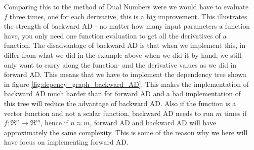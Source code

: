 Comparing this to the method of Dual Numbers were we would have to evaluate $f$ three times, one for each derivative, this is a big improvement. This illustrates the strength of backward AD - no matter how many input parameters a function have, you only need one function evaluation to get all the derivatives of a function. The disadvantage of backward AD is that when we implement this, in differ from what we did in the example above when we did it by hand, we still only want to carry along the function- and the derivative values as we did in forward AD. This means that we have to implement the dependency tree shown in figure \ref{fig:depency_graph_backward_AD}. This makes the implementation of backward AD much harder than for forward AD and a bad implementation of this tree will reduce the advantage of backward AD. Also if the function is a vector function and not a scalar function, backward AD needs to run $m$ times if $f: \Re^n \rightarrow \Re^m$, hence if $n\approx m$, forward AD and backward AD will have approximately the same complexity. This is some of the reason why we here will have focus on implementing forward AD.

